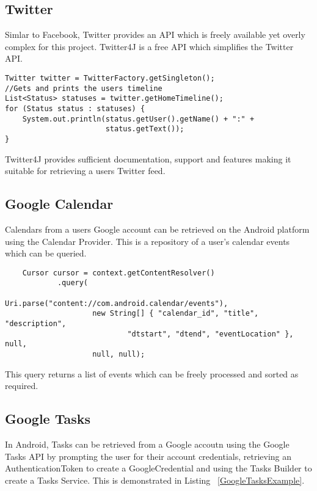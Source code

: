 \subsection{Twitter}

Simlar to Facebook, Twitter provides an API which is freely available yet overly complex for this project. Twitter4J is a free API which simplifies the Twitter API.

\begin{lstlisting}
Twitter twitter = TwitterFactory.getSingleton();
//Gets and prints the users timeline
List<Status> statuses = twitter.getHomeTimeline();
for (Status status : statuses) {
    System.out.println(status.getUser().getName() + ":" +
                       status.getText());
}
\end{lstlisting}

Twitter4J provides sufficient documentation, support and features making it suitable for retrieving a users Twitter feed.  

\subsection{Google Calendar}
Calendars from a users Google account can be retrieved on the Android platform using the Calendar Provider. This is a repository of a user's calendar events which can be queried.

\lstset{language=Java, caption=Calendar Provider example }
\begin{lstlisting}
    Cursor cursor = context.getContentResolver()
            .query(
                    Uri.parse("content://com.android.calendar/events"),
                    new String[] { "calendar_id", "title", "description",
                            "dtstart", "dtend", "eventLocation" }, null,
                    null, null);
\end{lstlisting}

This query returns a list of events which can be freely processed and sorted as required. 
\subsection{Google Tasks}
In Android, Tasks can be retrieved from a Google accoutn using the Google Tasks API by prompting the user for their account credentials, retrieving an AuthenticationToken to create a GoogleCredential and using the Tasks Builder to create a Tasks Service. This is demonstrated in Listing ~\ref{GoogleTasksExample}.

